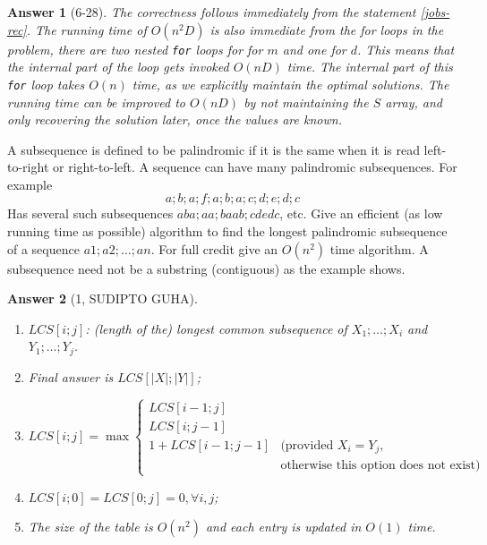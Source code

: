 \documentclass[11pt]{article}
\theoremstyle{numberplain}
\theoremstyle{nonumberplain}
\newtheorem{ans}{Answer}
\newcommand{\0}{{\mathbf{0}}}
\begin{document}
\begin{ans}[6-28]
The correctness follows immediately from the statement 
\ref{jobs-rec}.  The running time of $O(n^2D)$ is also immediate 
from the for loops in the problem, there are two nested  {\tt for}
loops for for $m$ and one for $d$. This means that the internal part
of the loop gets invoked $O(nD)$ time. 
The internal part of this {\tt for} loop
takes $O(n)$ time, as we explicitly maintain the optimal solutions. 
The running time can be improved to $O(nD)$ by not maintaining the
$S$ array, and only recovering the solution later, once the values
are known. 

\end{ans}

\begin{ques}
 A subsequence is defined to be palindromic if it is the same when it
is read left-to-right or right-to-left. A sequence can have many palindromic subsequences. For
example
$$a; b; a; f; a; b; a; c; d; e; d; c$$
Has several such subsequences $aba; aa; baab; cdedc$, etc. Give an efficient (as low running time as
possible) algorithm to find the longest palindromic subsequence of a sequence $a1; a2;\ldots ;an$. For
full credit give an $O(n^2)$ time algorithm. A subsequence need not be a substring (contiguous) as the example shows.
\end{ques}


\begin{ans}[1, SUDIPTO GUHA]
\begin{enumerate}
\item $LCS[i; j]$: (length of the) longest common subsequence of 
$X_1; \ldots ;X_i$ and $Y_1;\ldots; Y_j $.
\item Final answer is $LCS[|X|; |Y |]$;
\item $LCS[i; j] = \max \left\{
\begin{array}{cc}
LCS[i -1; j]\\
LCS[i; j -1]\\
1 + LCS[i -1; j -1] &\text{(provided }X_i = Y_j, \\
&\text{otherwise this option does not exist)}
\end{array}
\right.
$
\item 
$LCS[i; 0] = LCS[0; j] = 0 ,\forall i, j$;
\item The size of the table is $O(n^2)$
and each entry is updated in $O(1)$ time.
\end{enumerate}
\end{ans}
\end{document}
